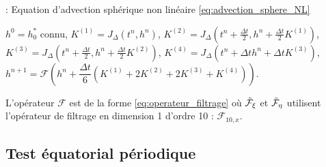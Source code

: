 \begin{center}
\begin{minipage}[H]{12cm}
  \begin{algorithm}[H]
    \caption{: Equation d'advection sphérique non linéaire \eqref{eq:advection_sphere_NL} }\label{alg:RK4_transportSa_NL}
    \begin{algorithmic}[1]
    \State $h^0 = h_0^*$ connu,
             \State  $K^{(1)} = J_{\Delta}(t^n, h^n)$,
             \State  $K^{(2)} = J_{\Delta}\left(t^n + \frac{\Delta t}{2}, h^n + \frac{\Delta t}{2} K^{(1)} \right)$,
             \State  $K^{(3)} = J_{\Delta}\left(t^n + \frac{\Delta t}{2}, h^n + \frac{\Delta t}{2} K^{(2)} \right)$,
             \State  $K^{(4)} = J_{\Delta}\left(t^n + \Delta t h^n + \Delta t K^{(3)} \right)$,  
             \State  $h^{n+1} = \mathcal{F}\left( h^n  + \dfrac{\Delta t}{6} \left( K^{(1)} + 2 K^{(2)} + 2 K^{(3)} + K^{(4)} \right) \right)$.
            \EndFor
    \end{algorithmic}
    \end{algorithm}
\end{minipage}
\end{center}

L'opérateur $\mathcal{F}$ est de la forme \eqref{eq:operateur_filtrage} où $\tilde{\mathcal{F}}_{\xi}$ et $\tilde{\mathcal{F}}_{\eta}$ utilisent l'opérateur de filtrage en dimension 1 d'ordre 10 : $\mathcal{F}_{10,x}$.


























\subsection{Test équatorial périodique}

